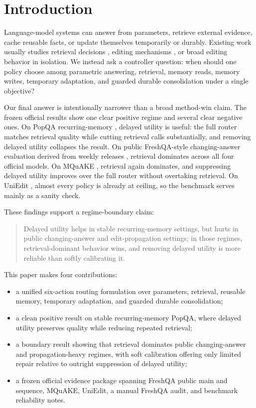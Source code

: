 \section{Introduction}

Language-model systems can answer from parameters, retrieve external evidence, cache reusable facts, or update themselves temporarily or durably. Existing work usually studies retrieval decisions \citep{asai2024selfrag,yan2024crag}, editing mechanisms \citep{wang2024wise,yu2023melo}, or broad editing behavior \citep{zhang2024keStudy} in isolation. We instead ask a controller question: when should one policy choose among parametric answering, retrieval, memory reads, memory writes, temporary adaptation, and guarded durable consolidation under a single objective?

Our final answer is intentionally narrower than a broad method-win claim. The frozen official results show one clear positive regime and several clear negative ones. On PopQA recurring-memory \citep{mallen2022trust}, delayed utility is useful: the full router matches retrieval quality while cutting retrieval calls substantially, and removing delayed utility collapses the result. On public FreshQA-style changing-answer evaluation derived from weekly releases \citep{vu2024freshllms}, retrieval dominates across all four official models. On MQuAKE \citep{zhong2023mquake}, retrieval again dominates, and suppressing delayed utility improves over the full router without overtaking retrieval. On UniEdit \citep{chen2025uniedit}, almost every policy is already at ceiling, so the benchmark serves mainly as a sanity check.

These findings support a regime-boundary claim:
\begin{quote}
Delayed utility helps in stable recurring-memory settings, but hurts in public changing-answer and edit-propagation settings; in those regimes, retrieval-dominant behavior wins, and removing delayed utility is more reliable than softly calibrating it.
\end{quote}

This paper makes four contributions:
\begin{itemize}[leftmargin=1.5em]
\item a unified six-action routing formulation over parameters, retrieval, reusable memory, temporary adaptation, and guarded durable consolidation;
\item a clean positive result on stable recurring-memory PopQA, where delayed utility preserves quality while reducing repeated retrieval;
\item a boundary result showing that retrieval dominates public changing-answer and propagation-heavy regimes, with soft calibration offering only limited repair relative to outright suppression of delayed utility;
\item a frozen official evidence package spanning FreshQA public main and sequence, MQuAKE, UniEdit, a manual FreshQA audit, and benchmark reliability notes.
\end{itemize}
